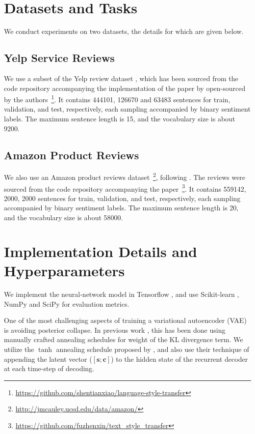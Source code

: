 \section{Datasets and Tasks} \label{sec:datasets-tasks}

We conduct experiments on two datasets, the details for which are given below.

\subsection{Yelp Service Reviews}

We use a subset of the Yelp review dataset \citep{challenge2013yelp}, which has been sourced from the code repository accompanying the implementation of the paper by \cite{shen2017style} open-sourced by the authors~\footnote{\url{https://github.com/shentianxiao/language-style-transfer}}. It contains 444101, 126670 and 63483 sentences for train, validation, and test, respectively, each sampling accompanied by binary sentiment labels. The maximum sentence length is 15, and the vocabulary size is about 9200.

\subsection{Amazon Product Reviews}

We also use an Amazon product reviews dataset~\footnote{\url{http://jmcauley.ucsd.edu/data/amazon/}}, following \cite{fu2017style}. The reviews were sourced from the code repository accompanying the paper~\footnote{\url{https://github.com/fuzhenxin/text_style_transfer}}. It contains 559142, 2000, 2000 sentences for train, validation, and test, respectively, each sampling accompanied by binary sentiment labels. The maximum sentence length is 20, and the vocabulary size is about 58000.


\section{Implementation Details and Hyperparameters}

We implement the neural-network model in Tensorflow \citep{abadi2016tensorflow}, and use Scikit-learn \cite{pedregosa2011scikit}, NumPy and SciPy for evaluation metrics.

One of the most challenging aspects of training a variational autoencoder (VAE) is avoiding posterior collapse. In previous work \citep{yang2017improved, bowman2016generating, bahuleyan2017variational}, this has been done using manually crafted annealing schedules for weight of the KL divergence term. We utilize the $\tanh$ annealing schedule proposed by \cite{bahuleyan2017variational}, and also use their technique of appending the latent vector ($[\bm s; \bm c]$) to the hidden state of the recurrent decoder at each time-step of decoding.


